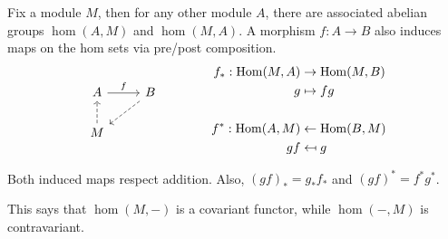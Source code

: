 \documentclass[twoside,10pt]{report}
\begin{document}
Fix a module $M$, then for any other module $A$, there are associated abelian groups $\hom(A,M)$ and $\hom(M,A)$. A morphism $f:A\to B$ also induces maps on the hom sets via pre/post composition.
\begin{equation*}
        \begin{aligned}[c]
                \begin{tikzcd}
			A \rar{f} & B \arrow[dl, dashed] \\
			M \uar[dashed]
                \end{tikzcd}
        \end{aligned}
        \qquad\qquad
        \begin{aligned}[c]
		f_{*}: \hom(M, A) &\to \hom(M,B) \\
		g &\mapsto fg\\ \\
		f^{*}: \hom(A, M) &\leftarrow \hom(B,M) \\
		gf &\mapsfrom g
        \end{aligned}
\end{equation*}

\begin{prop}
	Both induced maps respect addition. Also, $(gf)_{*}=g_{*}f_{*}$ and $(gf)^{*}=f^{*}g^{*}$.
\end{prop}
\begin{note}
	This says that $\hom(M,-)$ is a covariant functor, while $\hom(-,M)$ is contravariant.
\end{note}
\end{document}
